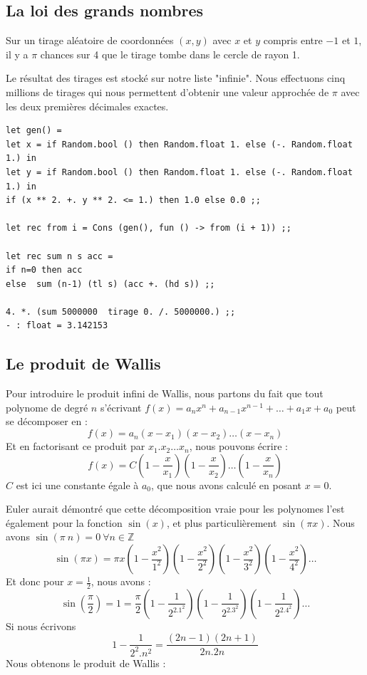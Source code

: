 \subsection{La loi des grands nombres}
Sur un tirage aléatoire de coordonnées $(x,y)$ avec $x$ et $y$ compris entre $-1$ et $1$,
il y a  $\pi$ chances sur 4 que le tirage tombe dans le cercle de rayon 1.
\begin{center}
\vspace{0.5cm}
\end{center} 

Le résultat des tirages est stocké sur notre liste "infinie". Nous effectuons cinq millions de tirages qui nous
permettent d'obtenir une valeur approchée de $\pi$  avec les deux premières décimales exactes.
\begin{Verbatim}
let gen() = 
let x = if Random.bool () then Random.float 1. else (-. Random.float 1.) in
let y = if Random.bool () then Random.float 1. else (-. Random.float 1.) in
if (x ** 2. +. y ** 2. <= 1.) then 1.0 else 0.0 ;;

let rec from i = Cons (gen(), fun () -> from (i + 1)) ;;

let rec sum n s acc =
if n=0 then acc
else  sum (n-1) (tl s) (acc +. (hd s)) ;;
  
4. *. (sum 5000000  tirage 0. /. 5000000.) ;;
- : float = 3.142153
\end{Verbatim}

\subsection{Le produit de Wallis}
Pour introduire le produit infini de Wallis, nous partons du fait que tout polynome
de degré $n$ s'écrivant $f(x) = a_n x^n + a_{n-1} x^{n-1}+ \dots + a_1 x + a_0$ peut se décomposer en :
$$ f(x) = a_n(x-x_1)(x-x_2)\dots(x-x_n)$$
Et en factorisant ce produit par $x_1.x_2\dots x_n$, nous pouvons écrire :
$$ f(x) = C (1-\frac{x}{x_1})(1-\frac{x}{x_2})\dots(1-\frac{x}{x_n}) $$ 
$C$ est ici une constante égale à $a_0$, que nous avons calculé en posant $x=0$.

Euler aurait démontré que cette décomposition vraie pour les polynomes l'est également pour la fonction $\sin(x)$, et plus
particulièrement $\sin(\pi x)$. Nous avons $\sin(\pi\ n)=0\ \forall n \in \mathbb{Z}$
$$\sin (\pi x) = \pi x (1-\frac{x^2}{1^2})(1-\frac{x^2}{2^2})(1-\frac{x^2}{3^2})(1-\frac{x^2}{4^2})\dots $$
Et donc pour $x=\frac{1}{2}$, nous avons :
$$\sin (\frac{\pi}{2}) = 1 = \frac{\pi}{2} (1-\frac{1}{2^2.1^2}) (1-\frac{1}{2^2.3^2}) (1-\frac{1}{2^2.4^2}) \dots $$
Si nous écrivons 
$$1-\frac{1}{2^2.n^2} = \frac{(2n-1)(2n+1)}{2n.2n} $$
Nous obtenons le produit de Wallis :

